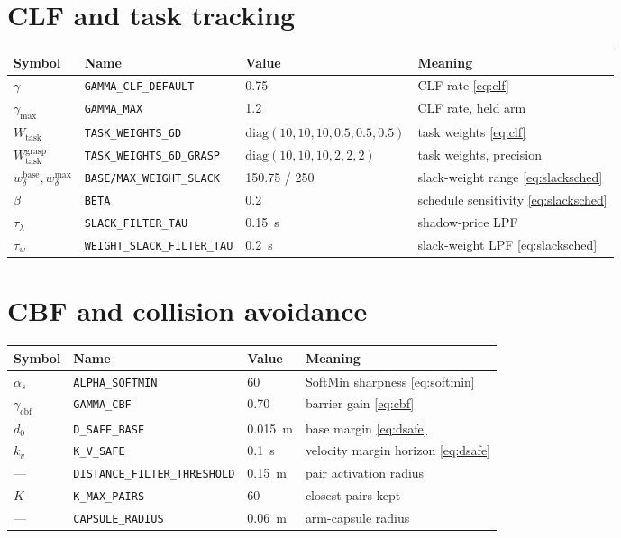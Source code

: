 \documentclass[12pt,a4paper,twoside,openright]{report}
\begin{document}
\section{CLF and task tracking}
\begin{tabularx}{\linewidth}{@{}lllX@{}}
\toprule
Symbol & Name & Value & Meaning \\
\midrule
$\gamma$ & \texttt{GAMMA\_CLF\_DEFAULT} & 0.75 & CLF rate \eqref{eq:clf} \\
$\gamma_{\max}$ & \texttt{GAMMA\_MAX} & 1.2 & CLF rate, held arm \\
$W_{\text{task}}$ & \texttt{TASK\_WEIGHTS\_6D} & $\mathrm{diag}(10,10,10,0.5,0.5,0.5)$ & task weights \eqref{eq:clf} \\
$W_{\text{task}}^{\text{grasp}}$ & \texttt{TASK\_WEIGHTS\_6D\_GRASP} & $\mathrm{diag}(10,10,10,2,2,2)$ & task weights, precision \\
$w_{\delta}^{\text{base}}, w_{\delta}^{\max}$ & \texttt{BASE/MAX\_WEIGHT\_SLACK} & 150.75 / 250 & slack-weight range \eqref{eq:slacksched} \\
$\beta$ & \texttt{BETA} & 0.2 & schedule sensitivity \eqref{eq:slacksched} \\
$\tau_{\lambda}$ & \texttt{SLACK\_FILTER\_TAU} & 0.15~s & shadow-price LPF \\
$\tau_{w}$ & \texttt{WEIGHT\_SLACK\_FILTER\_TAU} & 0.2~s & slack-weight LPF \eqref{eq:slacksched} \\
\bottomrule
\end{tabularx}

\section{CBF and collision avoidance}
\begin{tabularx}{\linewidth}{@{}lllX@{}}
\toprule
Symbol & Name & Value & Meaning \\
\midrule
$\alpha_s$ & \texttt{ALPHA\_SOFTMIN} & 60 & SoftMin sharpness \eqref{eq:softmin} \\
$\gamma_{\text{cbf}}$ & \texttt{GAMMA\_CBF} & 0.70 & barrier gain \eqref{eq:cbf} \\
$d_0$ & \texttt{D\_SAFE\_BASE} & 0.015~m & base margin \eqref{eq:dsafe} \\
$k_v$ & \texttt{K\_V\_SAFE} & 0.1~s & velocity margin horizon \eqref{eq:dsafe} \\
--- & \texttt{DISTANCE\_FILTER\_THRESHOLD} & 0.15~m & pair activation radius \\
$K$ & \texttt{K\_MAX\_PAIRS} & 60 & closest pairs kept \\
--- & \texttt{CAPSULE\_RADIUS} & 0.06~m & arm-capsule radius \\
\bottomrule
\end{tabularx}
\end{document}
